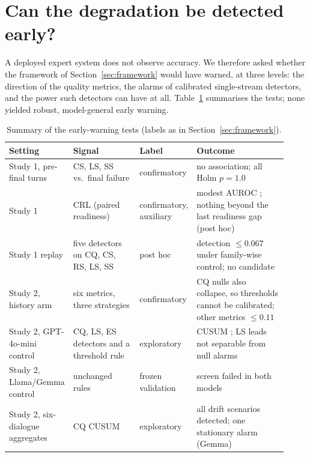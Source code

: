 \section{Can the degradation be detected early?}
\label{sec:monitoring}

A deployed expert system does not observe accuracy. We therefore asked whether
the framework of Section~\ref{sec:framework} would have warned, at three
levels: the direction of the quality metrics, the alarms of calibrated
single-stream detectors, and the power such detectors can have at all.
Table~\ref{tab:warningsummary} summarises the tests; none yielded robust,
model-general early warning.

\begin{table}[!htbp]
\centering
\caption{Summary of the early-warning tests (labels as in
Section~\ref{sec:framework}).}
\label{tab:warningsummary}
\footnotesize
\setlength{\tabcolsep}{4pt}
\begin{tabular}{@{}>{\raggedright\arraybackslash}p{0.20\linewidth}
>{\raggedright\arraybackslash}p{0.24\linewidth}
>{\raggedright\arraybackslash}p{0.15\linewidth}
>{\raggedright\arraybackslash}p{0.33\linewidth}@{}}
\toprule
Setting & Signal & Label & Outcome\\
\midrule
Study 1, pre-final turns & CS, LS, SS vs.\ final failure & confirmatory &
no association; all Holm $p=1.0$\\
Study 1 & CRL (paired readiness) & confirmatory, auxiliary & modest AUROC
\crlAuroc{}; nothing beyond the last readiness gap (post hoc)\\
Study 1 replay & five detectors on CQ, CS, RS, LS, SS & post hoc &
detection $\le0.067$ under family-wise control; no candidate\\
Study 2, history arm & six metrics, three strategies & confirmatory &
CQ nulls also collapse, so thresholds cannot be calibrated; other metrics
$\le0.11$\\
Study 2, GPT-4o-mini control & CQ, LS, ES detectors and a threshold rule &
exploratory & CUSUM \ctrlScreenDetect{}; LS leads not separable from null
alarms\\
Study 2, Llama/Gemma control & unchanged rules & frozen validation &
screen failed in both models\\
Study 2, six-dialogue aggregates & CQ CUSUM & exploratory & all drift
scenarios detected; one stationary alarm (Gemma)\\
\bottomrule
\end{tabular}
\end{table}

